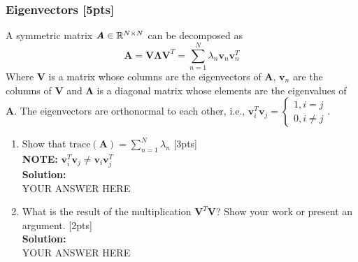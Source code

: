 \documentclass{article}
\begin{document}
\subsubsection{Eigenvectors [5pts]}
A symmetric matrix $\textbf{\textit{A}}\in \mathbb{R}^{N\times N}$ can be decomposed as
$$\boldsymbol{A}=\boldsymbol{V} \boldsymbol{\Lambda } \boldsymbol{V}^T=\sum_{n=1}^N \lambda_n \boldsymbol{v}_n \boldsymbol{v}_n^T$$
Where $\boldsymbol{V}$ is a matrix whose columns are the eigenvectors of $\boldsymbol{A}$, $\boldsymbol{v}_n$ are the columns of $\boldsymbol{V}$ and $\boldsymbol{\Lambda}$ is a diagonal matrix whose elements are the eigenvalues of $\boldsymbol{A}$. The eigenvectors are orthonormal to each other, i.e., $\boldsymbol{v}_i^T\boldsymbol{v}_j=\left\{
\begin{matrix}
1, i=j \\
0, i\neq j
\end{matrix}
\right.$.
\begin{enumerate}[label=(\alph*)]
\item Show that $\text{trace}(\boldsymbol{A})=\sum_{n=1}^N \lambda_n$ [3pts]\\
\textbf{NOTE:} $\boldsymbol{v}_i^T\boldsymbol{v}_j\neq \boldsymbol{v}_i\boldsymbol{v}_j^T$\bigskip \\
\textbf{Solution:}\\
YOUR ANSWER HERE
\newpage
\item What is the result of the multiplication $\boldsymbol{V}^T \boldsymbol{V}$? Show your work or present an argument. [2pts]\bigskip \\
\textbf{Solution:}\\
YOUR ANSWER HERE
\newpage
\end{enumerate}
\end{document}
